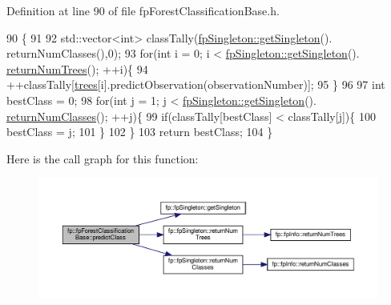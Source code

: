 Definition at line 90 of file fp\+Forest\+Classification\+Base.\+h.


\begin{DoxyCode}
90                                                    \{
91 
92                 std::vector<int> classTally(\hyperlink{classfp_1_1fpSingleton_a8bdae77b68521003e3fc630edec2e240}{fpSingleton::getSingleton}().
      returnNumClasses(),0);
93                 \textcolor{keywordflow}{for}(\textcolor{keywordtype}{int} i = 0; i < \hyperlink{classfp_1_1fpSingleton_a8bdae77b68521003e3fc630edec2e240}{fpSingleton::getSingleton}().
      \hyperlink{classfp_1_1fpSingleton_a8be36616345b6b77ce4c60b99cc2b91c}{returnNumTrees}(); ++i)\{
94                     ++classTally[\hyperlink{classfp_1_1fpForestClassificationBase_a51482a6c95c4b3cb42627f029c2d4662}{trees}[i].predictObservation(observationNumber)];
95                 \}
96 
97                 \textcolor{keywordtype}{int} bestClass = 0;
98                 \textcolor{keywordflow}{for}(\textcolor{keywordtype}{int} j = 1; j < \hyperlink{classfp_1_1fpSingleton_a8bdae77b68521003e3fc630edec2e240}{fpSingleton::getSingleton}().
      \hyperlink{classfp_1_1fpSingleton_a5602580110329a6b25602b1789e4e2c2}{returnNumClasses}(); ++j)\{
99                     \textcolor{keywordflow}{if}(classTally[bestClass] < classTally[j])\{
100                         bestClass = j;
101                     \}
102                 \}
103                 \textcolor{keywordflow}{return} bestClass;
104             \}
\end{DoxyCode}
Here is the call graph for this function\+:\nopagebreak
\begin{figure}[H]
\begin{center}
\leavevmode
\includegraphics[width=350pt]{classfp_1_1fpForestClassificationBase_ad0c690fff971fab681467fbcd8762b5f_cgraph}
\end{center}
\end{figure}
\mbox{\label{classfp_1_1fpForestClassificationBase_a6b5243d32b468308a4f013ad5a9df2dd}} 
